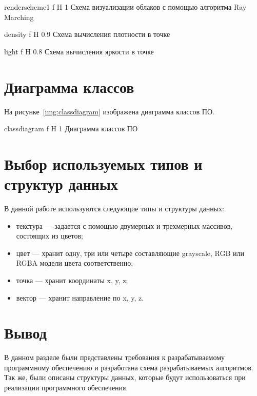 {renderscheme1} %
{f} %
{H} %
{1\textwidth} %
{Схема визуализации облаков с помощью алгоритма Ray Marching} %


{density} %
{f} %
{H} %
{0.9\textwidth} %
{Схема вычисления плотности в точке} %

{light} %
{f} %
{H} %
{0.8\textwidth} %
{Схема вычисления яркости в точке} %

\section{Диаграмма классов}

На рисунке~\ref{img:classdiagram} изображена диаграмма классов ПО.

{classdiagram} %
{f} %
{H} %
{1\textwidth} %
{Диаграмма классов ПО} %


\section{Выбор используемых типов и структур данных}

В данной работе используются следующие типы и структуры данных:
\begin{itemize}
	\item текстура --- задается с помощью двумерных и трехмерных массивов, состоящих из цветов;
	\item цвет --- хранит одну, три или четыре составляющие grayscale, RGB или RGBA модели цвета соответственно;
	\item точка --- хранит координаты x, y, z;
	\item вектор --- хранит направление по x, y, z.
\end{itemize}


\section*{Вывод}
В данном разделе были представлены требования к разрабатываемому
программному обеспечению и разработана схема разрабатываемых алгоритмов.
Так же, были описаны структуры данных, которые будут использоваться при реализации программного обеспечения.


